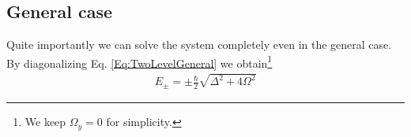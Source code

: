 \subsection{General case}

Quite importantly we can solve the system completely even in the general case. By diagonalizing  Eq. \eqref{Eq:TwoLevelGeneral} we obtain\footnote{We keep $\Omega_y =0$ for simplicity.}
\begin{align}\label{eq:Epm}
 E_\pm = \pm \frac{\hbar}{2} \sqrt{\Delta^2+4 \Omega^2}
\end{align}
